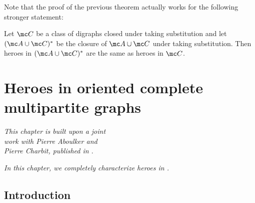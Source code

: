 Note that the proof of the previous theorem actually works for the following stronger statement:
\begin{theorem}
Let $\mc C$ be a class of digraphs closed under taking substitution and let $(\mc A \cup \mc C)^*$ be the closure of $\mc A \cup \mc C$ under taking substitution. Then heroes in $(\mc A \cup \mc C)^*$ are the same as heroes in $\mc C$. 
\end{theorem}

\chapter{Heroes in oriented complete multipartite graphs} \label{chpt:multipartite}

\begin{flushright}{\slshape    
This chapter is built upon a joint \\
work with Pierre Aboulker and \\
Pierre Charbit, published in \cite{AACmulti}}. \\ \medskip
\end{flushright}

\emph{In this chapter, we completely characterize heroes in \omgs.}

\section{Introduction}






